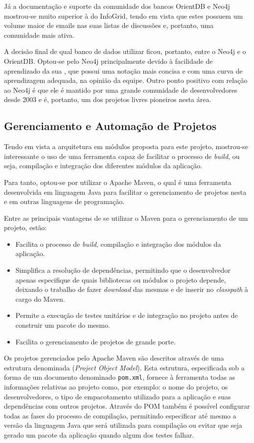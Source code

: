 Já a documentação e suporte da comunidade dos bancos OrientDB e Neo4j mostrou-se muito superior à do InfoGrid, tendo em vista que estes possuem um volume maior de emails nas suas listas de discussões e, portanto, uma comunidade mais ativa.

A decisão final de qual banco de dados utilizar ficou, portanto, entre o Neo4j e o OrientDB.
Optou-se pelo Neo4j principalmente devido à facilidade de aprendizado da sua , que possui uma notação mais concisa e com uma curva de aprendizagem adequada, na opinião da equipe.
Outro ponto positivo com relação ao Neo4j é que ele é mantido por uma grande comunidade de desenvolvedores desde 2003 e é, portanto, um dos projetos livres pioneiros nesta área.

\subsection{Gerenciamento e Automação de Projetos}

Tendo em vista a arquitetura em módulos proposta para este projeto, mostrou-se interessante o uso de uma ferramenta capaz de facilitar o processo de \emph{build}, ou seja, compilação e integração dos diferentes módulos da aplicação.

Para tanto, optou-se por utilizar o Apache Maven, o qual é uma ferramenta desenvolvida em linguagem Java para facilitar o gerenciamento de projetos nesta e em outras linguagens de programação.

Entre as principais vantagens de se utilizar o Maven para o gerenciamento de um projeto, estão:
\begin{itemize}
	\item Facilita o processo de \emph{build}, compilação e integração dos módulos da aplicação.
	\item Simplifica a resolução de dependências, permitindo que o desenvolvedor apenas especifique de quais bibliotecas ou módulos o projeto depende, deixando o trabalho de fazer \emph{download} das mesmas e de inserir no \emph{classpath} à cargo do Maven.
	\item Permite a execução de testes unitários e de integração no projeto antes de construir um pacote do mesmo.
	\item Facilita o gerenciamento de projetos de grande porte.
\end{itemize}

Os projetos gerenciados pelo Apache Maven são descritos através de uma estrutura denominada  (\emph{Project Object Model}).
Esta estrutura, especificada sob a forma de um documento  denominado \texttt{pom.xml}, fornece à ferramenta todas as informações relativas ao projeto como, por exemplo: o nome do projeto, os desenvolvedores, o tipo de empacotamento utilizado para a aplicação e suas dependências com outros projetos.
Através do POM também é possível configurar todas as fases do processo de compilação, permitindo especificar até mesmo a versão da linguagem Java que será utilizada para compilação ou evitar que seja gerado um pacote da aplicação quando algum dos testes falhar.

